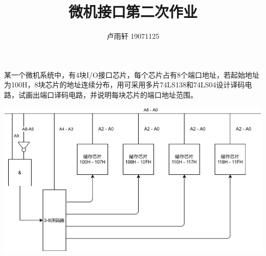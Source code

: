 \documentclass{ctexart}
\title{微机接口第二次作业}
\author{卢雨轩 19071125}
\begin{document}
\maketitle

某一个微机系统中，有4块I/O接口芯片，每个芯片占有8个端口地址，若起始地址为100H，8块芯片的地址连续分布，用可采用多片74LS138和74LS04设计译码电路，试画出端口译码电路，并说明每块芯片的端口地址范围。

\noindent\includegraphics[width=\textwidth]{2-image}
\end{document}
